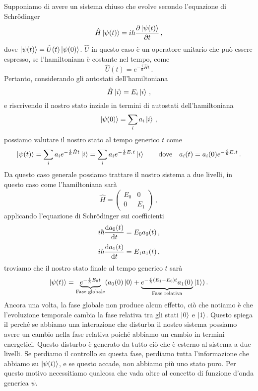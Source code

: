 Supponiamo di avere un sistema chiuso che evolve secondo l'equazione di Schrödinger
\begin{equation*}
    \hat H \ket{\psi(t)}=i\hbar \partialderivative{\ket{\psi(t)}}{t}\, ,
\end{equation*}
dove $\ket{\psi(t)}=\hat U(t)\ket{\psi(0)}$. $\hat U$ in questo caso è un operatore unitario che può essere espresso, se l'hamiltoniana è costante nel tempo, come
\begin{equation*}
    \hat U(t)=e^{-\frac{i}{\hbar}\hat H t}\, .
\end{equation*}
Pertanto, considerando gli autostati dell'hamiltoniana 
\begin{equation*}
    \hat H \ket{i}=E_i\ket{i}\, ,
\end{equation*}
e riscrivendo il nostro stato inziale in termini di autostati dell'hamiltoniana
\begin{equation*}
    \ket{\psi(0)}=\sum_i a_i\ket i\, ,
\end{equation*}
possiamo valutare il nostro stato al tempo generico $t$ come
\begin{equation*}
    \ket{\psi(t)}=\sum_i a_ie^{-\frac i \hbar \hat H t}\ket i=\sum_i a_i e^{-\frac i \hbar E_i t}\ket i \qquad \text{dove} \quad a_i(t)=a_i(0)e^{-\frac i \hbar E_i t}\, .
\end{equation*}
Da questo caso generale possiamo trattare il nostro sistema a due livelli, in questo caso come l'hamiltoniana sarà
\begin{equation*}
    \hat H = \begin{pmatrix}
        E_0 & 0 \\
        0 & E_1
       \end{pmatrix}\, ,
\end{equation*}
applicando l'equazione di Schrödinger sui coefficienti
\begin{equation*}
    i\hbar\derivative{a_0(t)}{t}=E_0a_0(t)\, ,
\end{equation*}
\begin{equation*}
    i\hbar\derivative{a_1(t)}{t}=E_1a_1(t)\, ,
\end{equation*}
troviamo che il nostro stato finale al tempo generico $t$ sarà
\begin{equation*}
    \ket{\psi(t)}=\underbrace{e^{-\frac{i}{\hbar}E_0t}}_{\text{Fase globale}}(a_0(0)\ket 0 +\underbrace{e^{-\frac{i}{\hbar}(E_1-E_0)t}a_1(0)}_{\text{Fase relativa}}\ket 1)\, .
\end{equation*}
Ancora una volta, la fase globale non produce alcun effetto, ciò che notiamo è che l'evoluzione temporale cambia la fase relativa tra gli stati $\ket 0$ e $\ket 1$. Questo spiega il perché se abbiamo una interazione che disturba il nostro sistema possiamo avere un cambio nella fase relativa poiché abbiamo un cambio in termini energetici. Questo disturbo è generato da tutto ciò che è esterno al sistema a due livelli. Se perdiamo il controllo su questa fase, perdiamo tutta l'informazione che abbiamo su $\ket{\psi(t)}$, e se questo accade, non abbiamo più uno stato puro. Per questo motivo necessitiamo qualcosa che vada oltre al concetto di funzione d'onda generica $\psi$.

